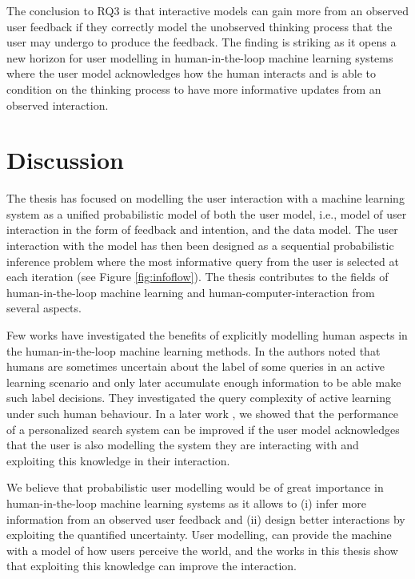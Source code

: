 \documentclass[dissertation,math,vertlayout,pdfa,colorlinks]{aaltoseries}
\begin{document}
The conclusion to RQ3 is that interactive models can gain more from an observed user feedback if they correctly model the unobserved thinking process that the user may undergo to produce the feedback. The finding is striking as it opens a new horizon for user modelling in human-in-the-loop machine learning systems where the user model acknowledges how the human interacts and is able to condition on the thinking process to have more informative updates from an observed interaction.

\chapter{Discussion}

The thesis has focused on modelling the user interaction with a machine learning system as a unified probabilistic model of both the user model, i.e., model of user interaction in the form of feedback and intention, and the data model. The user interaction with the model has then been designed as a sequential probabilistic inference problem where the most informative query from the user is selected at each iteration (see Figure \ref{fig:infoflow}). The thesis contributes to the fields of human-in-the-loop machine learning and human-computer-interaction from several aspects.

Few works have investigated the benefits of explicitly modelling human aspects in the human-in-the-loop machine learning methods. In \cite{NIPS2016_6155} the authors noted that humans are sometimes uncertain about the label of some queries in an active learning scenario and only later accumulate enough information to be able make such label decisions. They investigated the query complexity of active learning under such human behaviour. In a later work \cite{peltola2019machine}, we showed that the performance of a personalized search system can be improved if the user model acknowledges that the user is also modelling the system they are interacting with and exploiting this knowledge in their interaction. 

We believe that probabilistic user modelling would be of great importance in human-in-the-loop machine learning systems as it allows to (i) infer more information from an observed user feedback and (ii) design better interactions by exploiting the quantified uncertainty. User modelling, can provide the machine with a model of how users perceive the world, and the works in this thesis show that exploiting this knowledge can improve the interaction.
\end{document}
